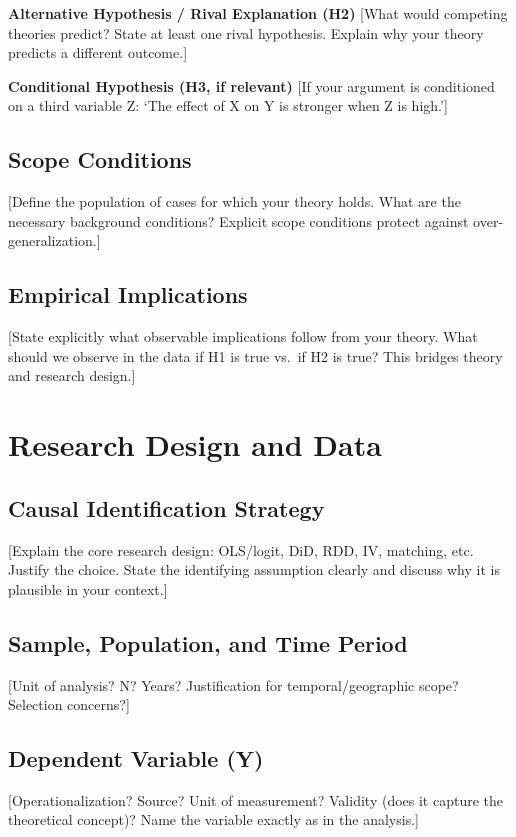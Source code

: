 \documentclass[12pt,a4paper]{article}
\begin{document}
\textbf{Alternative Hypothesis / Rival Explanation (H2)}
[What would competing theories predict? State at least one rival hypothesis. Explain why your theory predicts a different outcome.]

\textbf{Conditional Hypothesis (H3, if relevant)}
[If your argument is conditioned on a third variable Z: `The effect of X on Y is stronger when Z is high.']

\subsection{Scope Conditions} %
[Define the population of cases for which your theory holds. What are the necessary background conditions? Explicit scope conditions protect against over-generalization.]

\subsection{Empirical Implications} %
[State explicitly what observable implications follow from your theory. What should we observe in the data if H1 is true vs.\ if H2 is true? This bridges theory and research design.]

\section{Research Design and Data}\label{sec:design} %

\subsection{Causal Identification Strategy} %
[Explain the core research design: OLS/logit, DiD, RDD, IV, matching, etc. Justify the choice. State the identifying assumption clearly and discuss why it is plausible in your context.]

\subsection{Sample, Population, and Time Period} %
[Unit of analysis? N? Years? Justification for temporal/geographic scope? Selection concerns?]

\subsection{Dependent Variable (Y)} %
[Operationalization? Source? Unit of measurement? Validity (does it capture the theoretical concept)? Name the variable exactly as in the analysis.]
\end{document}
